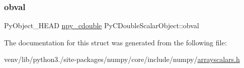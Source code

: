\subsubsection{\texorpdfstring{obval}{obval}}
{\footnotesize\ttfamily Py\+Object\+\_\+\+H\+E\+AD \hyperlink{structnpy__cdouble}{npy\+\_\+cdouble} Py\+C\+Double\+Scalar\+Object\+::obval}



The documentation for this struct was generated from the following file\+:\begin{DoxyCompactItemize}
\item 
venv/lib/python3./site-\/packages/numpy/core/include/numpy/\hyperlink{arrayscalars_8h}{arrayscalars.\+h}\end{DoxyCompactItemize}
